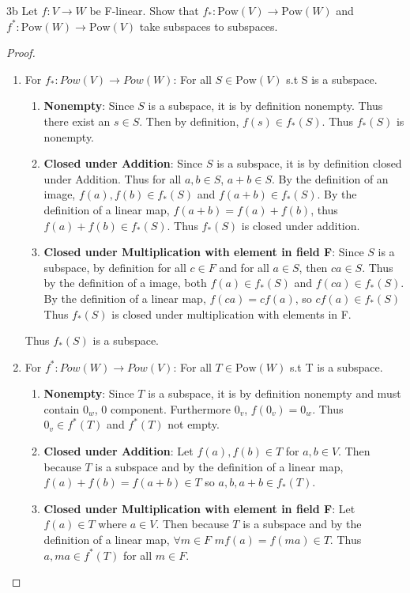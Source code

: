 \documentclass{article}
\newcommand{\rarr}[0]{\rightarrow}
\newcommand{\Pow}[1]{\text{Pow}(#1)}
\begin{document}
\begin{PROB}{3b}\label{Problem 3b.}
	Let $f: V \rarr W$ be F-linear.
	Show that $f_*: \Pow{V} \rarr \Pow{W}$ and $f^*: \Pow{W} \rarr \Pow{V}$ take subspaces to subspaces.
\end{PROB}
\begin{proof}
	\begin{enumerate}
		\item For $f_*: Pow(V) \rarr Pow(W)$: For all $S \in \Pow{V}$ s.t S is a subspace.
		\begin{enumerate}
			\item \textbf{Nonempty}: Since $S$ is a subspace, it is by definition nonempty. Thus there exist an $s \in S$. Then by definition, $f(s) \in f_*(S)$. Thus $f_*(S)$ is nonempty.
			\item \textbf{Closed under Addition}: Since $S$ is a subspace, it is by definition closed under Addition. Thus for all $a, b \in S$, $a + b \in S$. By the definition of an image, $f(a), f(b) \in f_*(S)$ and $f(a + b) \in f_*(S)$. By the definition of a linear map, $f(a + b) = f(a) + f(b)$, thus $f(a) + f(b) \in f_*(S)$. Thus $f_*(S)$ is closed under addition.
			\item \textbf{Closed under Multiplication with element in field F}: Since $S$ is a subspace, by definition for all $c \in F$ and for all $a \in S$, then $ca \in S$. Thus by the definition of a image, both $f(a) \in f_*(S)$ and $f(ca) \in f_*(S)$. By the definition of a linear map, $f(ca) = cf(a)$, so $cf(a) \in f_*(S)$ Thus $f_*(S)$ is closed under multiplication with elements in F. 
		\end{enumerate}
		
		Thus $f_*(S)$ is a subspace.

		\item For $f^*: Pow(W) \rarr Pow(V)$: For all $T \in \Pow{W}$ s.t T is a subspace.
		\begin{enumerate}
			\item \textbf{Nonempty}: Since $T$ is a subspace, it is by definition nonempty and must contain $0_w$, 0 component. Furthermore $0_v$, $f(0_v) = 0_w$. Thus $0_v \in f^*(T)$ and $f^*(T)$ not empty.
			\item \textbf{Closed under Addition}: Let $f(a), f(b) \in T$ for $a, b \in V$. Then because $T$ is a subspace and by the definition of a linear map, $f(a) + f(b) = f(a + b) \in T$ so $a, b, a + b \in f_*(T)$.
			\item \textbf{Closed under Multiplication with element in field F}: Let $f(a) \in T$ where $a \in V$. Then because $T$ is a subspace and by the definition of a linear map, $\forall m \in F$ $mf(a) = f(ma) \in T$. Thus $a, ma \in f^*(T)$ for all $m \in F$.
		\end{enumerate}
	\end{enumerate}
\end{proof}
\end{document}

